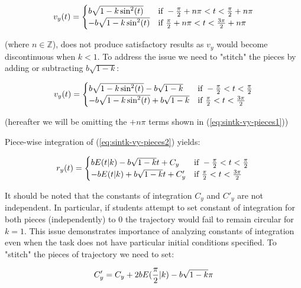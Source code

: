 \documentclass[journal]{IEEEtran}
\begin{document}
\begin{equation}
v_y(t)=
\begin{cases} 
b \sqrt{1-k\sin^2(t)} & \text{if } -{\pi \over 2} + n\pi < t < {\pi \over 2} + n\pi \\
- b \sqrt{1-k\sin^2(t)} & \text{if } {\pi \over 2} + n\pi < t < {3\pi \over 2} + n\pi
\end{cases}
\label{eq:sintk-vy-pieces1}
\end{equation}

(where $n \in \mathbb {Z}$), does not produce satisfactory results as $v_y$ would become discontinuous when $k<1$. To address the issue we need to "stitch" the pieces by adding or subtracting $b\sqrt{1-k}$: 

\begin{equation}
v_y(t)=
\begin{cases} 
b \sqrt{1-k\sin^2(t)} - b\sqrt{1-k} & \text{if } -{\pi \over 2} < t < {\pi \over 2} \\
- b \sqrt{1-k\sin^2(t)} + b\sqrt{1-k}& \text{if } {\pi \over 2} < t < {3\pi \over 2} 
\end{cases}
\label{eq:sintk-vy-pieces2}
\end{equation}

(hereafter we will be omitting the $+n\pi$ terms shown in (\ref{eq:sintk-vy-pieces1}))

Piece-wise integration of (\ref{eq:sintk-vy-pieces2}) yields:

\begin{equation}
r_y(t)=
\begin{cases} 
b E(t|k)-b\sqrt{1-k}t+C_y & \text{if } -{\pi \over 2} < t < {\pi \over 2} \\
- b E(t|k)+b\sqrt{1-k}t+C'_y & \text{if } {\pi \over 2} < t < {3\pi \over 2} 
\end{cases}\\
\label{eq:sintk-ry-pieces}
\end{equation}

It should be noted that the constants of integration $C_y$ and $C'_y$ are not independent. In particular, if students attempt to set constant of integration for both pieces (independently) to $0$ the trajectory would fail to remain circular for $k=1$. This issue demonstrates importance of analyzing constants of integration even when the task does not have  particular initial conditions specified. To "stitch" the pieces of trajectory we need to set:

\begin{equation}
C'_y =C_y+2bE({\pi \over 2}|k)-b\sqrt{1-k}\pi 
\label{eq:sintk-ry-coi}
\end{equation}
\end{document}
